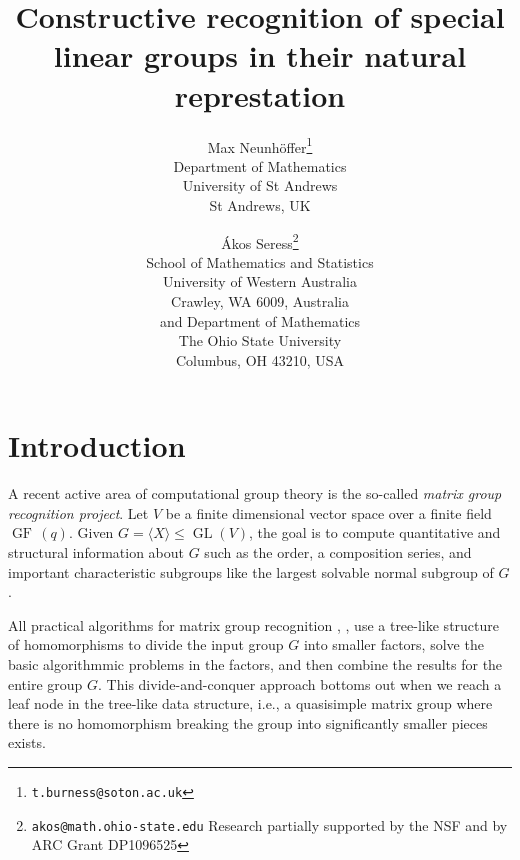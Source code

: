\documentclass[a4paper,11pt]{article}
\def\GF{\operatorname{GF\,}}
\def\GL{\operatorname{GL}}
\begin{document}
\title{Constructive recognition of special linear groups in their natural represtation}

\author{Max Neunh\"offer\footnote{\texttt{t.burness@soton.ac.uk}} \\ Department of Mathematics\\ University of St Andrews \\
St Andrews, UK \\ \and \'Akos Seress\footnote{\texttt{akos@math.ohio-state.edu}  Research partially supported by the NSF and by ARC Grant DP1096525}  \\ School of Mathematics and Statistics \\ University of Western Australia \\ Crawley, WA 6009, Australia \\ and  Department of Mathematics \\ The Ohio State University \\ Columbus, OH 43210, USA}

\date{}
\maketitle



\begin{abstract}

\end{abstract}

\section{Introduction}
\label{introduction}
A recent active area of computational group theory is the so-called
{\em matrix group recognition project}. Let $V$ be a finite dimensional vector space over a finite field $\GF(q)$. Given $G =\langle X \rangle \le \GL(V)$, the goal is to compute quantitative and structural information about $G$ such as the order, a composition series, and important characteristic subgroups like the largest solvable normal subgroup of $G$. 

All practical algorithms for matrix group recognition \cite{LG99}, \cite{NS06}, \cite{OB09} use a tree-like structure of homomorphisms to divide the input group $G$ into smaller factors, solve the basic algorithmmic problems in the factors, and then combine the results for the entire group $G$. This divide-and-conquer approach bottoms out when we reach a leaf node in the tree-like data structure, i.e., a quasisimple matrix group where there is no homomorphism breaking the group into significantly smaller pieces exists. 
\end{document}
